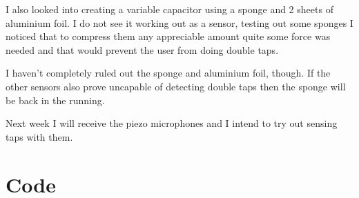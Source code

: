\documentclass{article}
\begin{document}
I also looked into creating a variable capacitor using a sponge and 2 sheets of aluminium foil. I do not see it working out as a sensor, testing out some sponges I noticed that to compress them any appreciable amount quite some force was needed and that would prevent the user from doing double taps.

I haven't completely ruled out the sponge and aluminium foil, though. If the other sensors also prove uncapable of detecting double taps then the sponge will be back in the running.

Next week I will receive the piezo microphones and I intend to try out sensing taps with them.
\newpage
\appendix
\section{Code}\label{appendix:code}

%
\end{document}
